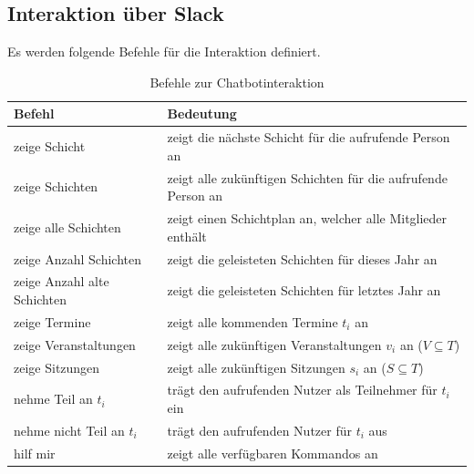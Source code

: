 \subsection{Interaktion über Slack}

Es werden folgende Befehle für die Interaktion definiert.

\begin{table}[H]
\centering
\begin{tabular}{l|l}
  \textbf{Befehl }& \textbf{Bedeutung }\\
 \hline
 zeige Schicht & zeigt die nächste Schicht für die aufrufende Person an \\
 zeige Schichten & zeigt alle zukünftigen Schichten für die aufrufende Person an \\
 zeige alle Schichten & zeigt einen Schichtplan an, welcher alle Mitglieder enthält \\
 
 zeige Anzahl Schichten & zeigt die geleisteten Schichten für dieses Jahr an \\
 zeige Anzahl alte Schichten & zeigt die geleisteten Schichten für letztes Jahr an \\
 
 zeige Termine & zeigt alle kommenden Termine $t_i$ an \\
 zeige Veranstaltungen & zeigt alle zukünftigen Veranstaltungen $v_i$ an ($V \subseteq T$) \\
 zeige Sitzungen & zeigt alle zukünftigen Sitzungen $s_i$ an ($S \subseteq T$) \\
 
 nehme Teil an $t_i$ & trägt den aufrufenden Nutzer als Teilnehmer für $t_i$ ein \\
 nehme nicht Teil an $t_i$ & trägt den aufrufenden Nutzer für $t_i$ aus\\

 hilf mir & zeigt alle verfügbaren Kommandos an \\
\end{tabular}
\caption{Befehle zur Chatbotinteraktion}
\label{tab:chatbotinteraktion}
\end{table}


